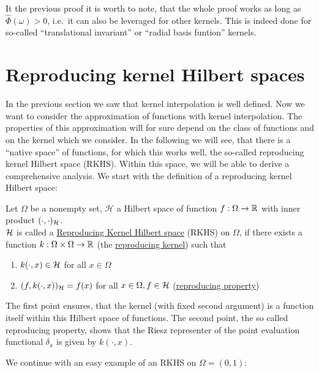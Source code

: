 It the previous proof it is worth to note, that the whole proof works as long as $\hat{\Phi}(\omega) > 0$, i.e.\ it can also be leveraged for other kernels.
This is indeed done for so-called ``translational invariant'' or ``radial basis funtion'' kernels.







\section{Reproducing kernel Hilbert spaces}

In the previous section we saw that kernel interpolation is well defined.
Now we want to consider the approximation of functions with kernel interpolation.
The properties of this approximation will for sure depend on the class of functions and on the kernel which we consider. 
In the following we will see, that there is a ``native space'' of functions, for which this works well, the so-called reproducing kernel Hilbert space (RKHS).
Within this space, we will be able to derive a  comprehensive analysis.
We start with the definition of a reproducing kernel Hilbert space:


\begin{definition}
\label{def:rkhs}
Let $\Omega$ be a nonempty set, $\mathcal{H}$ a Hilbert space of function $f: \Omega \rightarrow \mathbb{R}$ with inner product $(\cdot, \cdot)_{\mathcal{H}}$. \\
$\mathcal{H}$ is called a \underline{Reproducing Kernel Hilbert space} (RKHS) on $\Omega$,
if there exists a function $k: \Omega \times \Omega \rightarrow \mathbb{R}$ (the \underline{reproducing kernel}) such that
\begin{enumerate}
\item $k(\cdot, x) \in \mathcal{H}$ for all $x \in \Omega$
\item $(f, k(\cdot, x))_{\mathcal{H}} = f(x)$ for all $x \in \Omega, f \in \mathcal{H}$ (\underline{reproducing property})
\end{enumerate}
\end{definition}

The first point ensures, that the kernel (with fixed second argument) is a function itself within this Hilbert space of functions.
The second point, the so called reproducing property, shows that the Riesz representer of the point evaluation functional $\delta_x$ is given by $k(\cdot, x)$.

We continue with an easy example of an RKHS on $\Omega = (0, 1)$:

